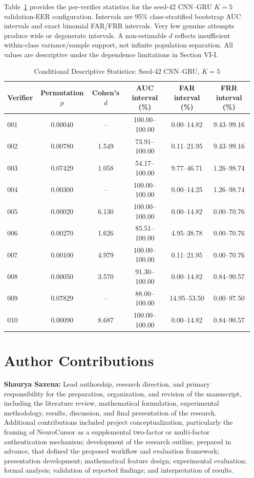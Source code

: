 \documentclass[conference]{IEEEtran}
\begin{document}
Table~\ref{tab:descriptive_statistics} provides the per-verifier statistics for
the seed-42 CNN--GRU $K=5$ validation-EER configuration. Intervals are 95\%
class-stratified bootstrap AUC intervals and exact binomial FAR/FRR intervals.
Very few genuine attempts produce wide or degenerate intervals. A non-estimable
$d$ reflects insufficient within-class variance/sample support, not infinite
population separation. All values are descriptive under the dependence
limitations in Section VI-I.

\begin{table}[t]
\centering
\caption{Conditional Descriptive Statistics: Seed-42 CNN--GRU, $K=5$}
\label{tab:descriptive_statistics}
\begin{tabular}{lccccc}
\toprule
Verifier & Permutation $p$ & Cohen's $d$ & AUC interval (\%) & FAR interval (\%) & FRR interval (\%) \\
\midrule
001 & 0.00040 & -- & 100.00--100.00 & 0.00--14.82 & 9.43--99.16 \\
002 & 0.00780 & 1.549 & 73.91--100.00 & 0.11--21.95 & 9.43--99.16 \\
003 & 0.07429 & 1.058 & 54.17--100.00 & 9.77--46.71 & 1.26--98.74 \\
004 & 0.00300 & -- & 100.00--100.00 & 0.00--14.25 & 1.26--98.74 \\
005 & 0.00020 & 6.130 & 100.00--100.00 & 0.00--14.82 & 0.00--70.76 \\
006 & 0.00270 & 1.626 & 85.51--100.00 & 4.95--38.78 & 0.00--70.76 \\
007 & 0.00100 & 4.979 & 100.00--100.00 & 0.11--21.95 & 0.00--70.76 \\
008 & 0.00050 & 3.570 & 91.30--100.00 & 0.00--14.82 & 0.84--90.57 \\
009 & 0.07829 & -- & 88.00--100.00 & 14.95--53.50 & 0.00--97.50 \\
010 & 0.00090 & 8.687 & 100.00--100.00 & 0.00--14.82 & 0.84--90.57 \\
\bottomrule
\end{tabular}
\end{table}

\section*{Author Contributions}

\textbf{Shaurya Saxena:} Lead authorship, research direction, and primary
responsibility for the preparation, organization, and revision of the
manuscript, including the literature review, mathematical formulation,
experimental methodology, results, discussion, and final presentation of the
research. Additional contributions included project conceptualization,
particularly the framing of NeuroCursor as a supplemental two-factor or
multi-factor authentication mechanism; development of the research outline,
prepared in advance, that defined the proposed workflow and evaluation
framework;
presentation development; mathematical feature design; experimental
evaluation; formal analysis; validation of reported findings; and
interpretation of results.
\end{document}
